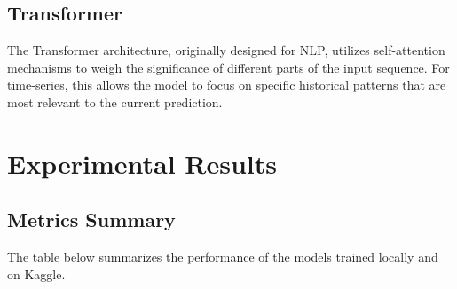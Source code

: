 \documentclass[11pt,a4paper,oneside]{book}
\begin{document}
\section{Transformer}
The Transformer architecture, originally designed for NLP, utilizes self-attention mechanisms to weigh the significance of different parts of the input sequence. For time-series, this allows the model to focus on specific historical patterns that are most relevant to the current prediction.

\chapter{Experimental Results}
\section{Metrics Summary}
The table below summarizes the performance of the models trained locally and on Kaggle.
\end{document}
